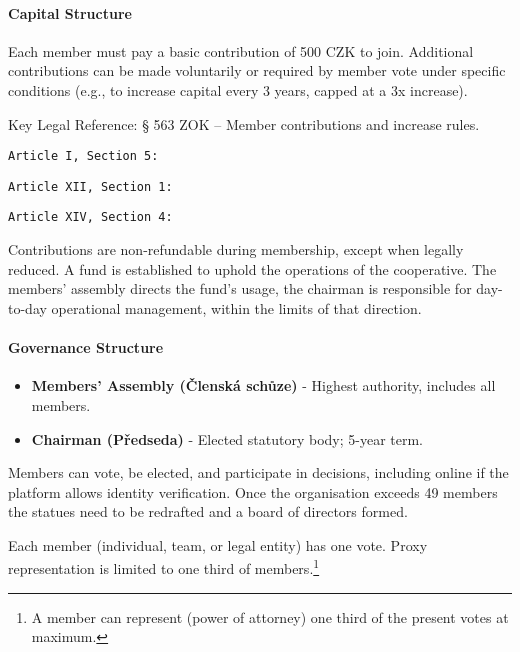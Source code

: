 \paragraph{Capital Structure}
Each member must pay a basic contribution of 500 CZK to join. Additional contributions can be made voluntarily or required by member vote under specific conditions (e.g., to increase capital every 3 years, capped at a 3x increase). 

Key Legal Reference: § 563 ZOK – Member contributions and increase rules.

\texttt{Article I, Section 5: }

\texttt{Article XII, Section 1: }

\texttt{Article XIV, Section 4: }

Contributions are non-refundable during membership, except when legally reduced. A fund is established to uphold the operations of the cooperative. The members’ assembly directs the fund’s usage, the chairman is responsible for day-to-day operational management, within the limits of that direction.
\paragraph{Governance Structure}
\begin{itemize}
    \item \textbf{Members’ Assembly (Členská schůze)} - Highest authority, includes all members.
    \item \textbf{Chairman (Předseda)} - Elected statutory body; 5-year term.
\end{itemize}
Members can vote, be elected, and participate in decisions, including online if the platform allows identity verification. Once the organisation exceeds 49 members the statues need to be redrafted and a board of directors formed.

Each member (individual, team, or legal entity) has one vote. Proxy representation is limited to one third of members.\footnote{A member can represent (power of attorney) one third of the present votes at maximum.}
